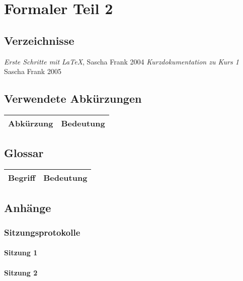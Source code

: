 \part{Formaler Teil 2}

\chapter{Verzeichnisse}
\listoftables
\listoffigures
\begin{thebibliography}{9}
     \emph{Erste Schritte mit \LaTeX},
    Sascha Frank 2004
     \emph{Kurzdokumentation zu Kurs 1}
    Sascha Frank 2005 
\end{thebibliography}

\chapter{Verwendete Abkürzungen}
\begin{table}[h!]
    \begin{tabular}{|L{0.3\textwidth}|L{0.6\textwidth}|}
        \hline
         Abkürzung & Bedeutung \\
        \hline
    \end{tabular}
\end{table}

\chapter{Glossar}
\begin{table}[h!]
    \begin{tabular}{|L{0.3\textwidth}|L{0.6\textwidth}|}
        \hline
         Begriff & Bedeutung \\[12pt]
        \hline
    \end{tabular}
\end{table}
\chapter{Anhänge}
\section{Sitzungsprotokolle}
\subsection{Sitzung 1}
\subsection{Sitzung 2}